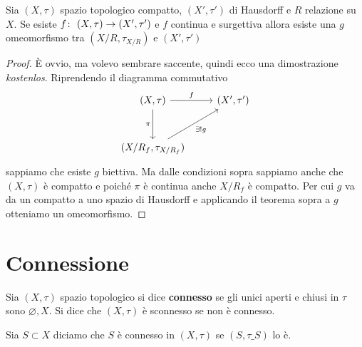 \begin{corollary}
	\label{thr:freeomeombyquo}
	Sia $(X, \tau)$ spazio topologico compatto, $(X', \tau')$ di Hausdorff e $R$ relazione su $X$. Se esiste $f \colon\ (X, \tau) \rightarrow (X', \tau')$ e $f$ continua e surgettiva allora esiste una $g$ omeomorfismo tra $(X/R,\tau_{X/R})$ e $(X', \tau')$
\end{corollary}
\begin{proof}
	È ovvio, ma volevo sembrare saccente, quindi ecco una dimostrazione \textit{kostenlos}.
	Riprendendo il diagramma commutativo 
	\begin{equation}
		\begin{tikzcd}[row sep = 3em]
			(X, \tau) \arrow[swap]{d}{\pi} \arrow{r}{f} & (X', \tau') \\
			(X/R_f, \tau_{X/R_f}) \arrow[swap]{ru}{\exists! g} &
		\end{tikzcd}	
	\end{equation}
	sappiamo che esiste $g$ biettiva. Ma dalle condizioni sopra sappiamo anche che $(X,\tau)$ è compatto e poiché $\pi$ è continua anche $X/R_f$ è compatto. Per cui $g$ va da un compatto a uno spazio di Hausdorff e applicando il teorema sopra a $g$ otteniamo un omeomorfismo. 
\end{proof}


\section{Connessione}

\begin{definition}
	Sia $(X, \tau)$ spazio topologico si dice \textbf{connesso} se gli unici aperti e chiusi in $\tau$ sono $\varnothing, X$. Si dice che $(X, \tau)$ è sconnesso se non è connesso. 
\end{definition} 

\begin{definition}
	Sia $S \subset X$ diciamo che $S$ è connesso in $(X, \tau)$ se $(S, \tau\_S)$ lo è. 
\end{definition} 

